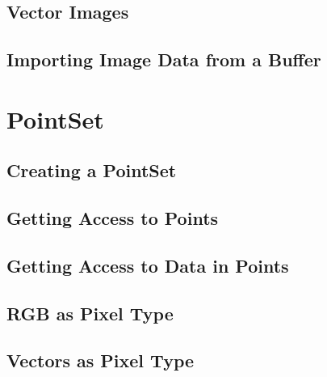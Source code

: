 \label{sec:DefiningRGBImages}



\subsection{Vector Images}
\label{sec:DefiningVectorImages}




\subsection{Importing Image Data from a Buffer}
\label{sec:ImportingImageDataFromABuffer}




\section{PointSet}
\label{PointSetSection}

\subsection{Creating a PointSet}
\label{sec:CreatingAPointSet}





\subsection{Getting Access to Points}
\label{sec:GettingAccessToPointsInThePointSet}





\subsection{Getting Access to Data in Points}
\label{sec:GettingAccessToDataInThePointSet}





\subsection{RGB as Pixel Type}
\label{sec:PointSetWithRGBAsPixelType}






\subsection{Vectors as Pixel Type}
\label{sec:PointSetWithVectorsAsPixelType}

